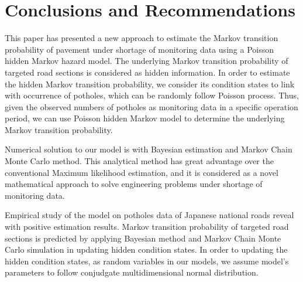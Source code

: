 \documentclass[a4paper,oneside,onecolumn,preprint,10pt,authoryear]{elsarticle}
\begin{document}
\section{Conclusions and Recommendations}
\label{sec7}
This paper has presented a new approach to estimate the Markov transition probability of pavement under shortage of monitoring data using a Poisson hidden Markov hazard model. The underlying Markov transition probability of targeted road sections is considered as hidden information. In order to estimate the hidden Markov transition probability, we consider its condition states to link with occurrence of potholes, which can be randomly follow Poisson process. Thus, given the observed numbers of potholes as monitoring data in a specific operation period, we can use Poisson hidden Markov model to determine the underlying Markov transition probability.

Numerical solution to our model is with Bayesian estimation and Markov Chain Monte Carlo method. This analytical method has great advantage over the conventional Maximum likelihood estimation, and it is considered as a novel mathematical approach to solve engineering problems under shortage of monitoring data. 

Empirical study of the model on potholes data of Japanese national roads reveal with positive estimation results. Markov transition probability of targeted road sections is predicted by applying Bayesian method and Markov Chain Monte Carlo simulation in updating hidden condition states. In order to updating the hidden condition states, as random variables in our models, we assume model's parameters to follow conjudgate multidimensional normal distribution.

%
\end{document}
